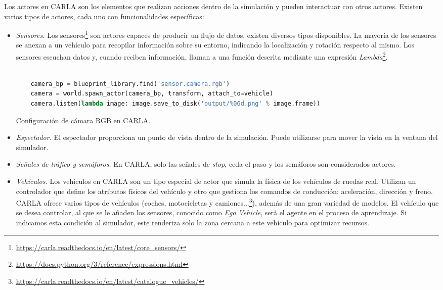Los actores en CARLA son los elementos que realizan acciones dentro de la simulación y pueden interactuar con otros actores. Existen varios tipos de actores, cada uno con funcionalidades específicas:

\begin{itemize}
\item \textit{Sensores.} Los sensores\footnote{\url{https://carla.readthedocs.io/en/latest/core_sensors/}} son actores capaces de producir un flujo de datos, existen diversos tipos disponibles. La mayoría de los sensores se anexan a un vehículo para recopilar información sobre su entorno, indicando la localización y rotación respecto al mismo. Los sensores escuchan datos y, cuando reciben información, llaman a una función descrita mediante una expresión \textit{Lambda}\footnote{\url{https://docs.python.org/3/reference/expressions.html}}. 

	\begin{code}[h]
	\begin{lstlisting}[language=python]
	
	camera_bp = blueprint_library.find('sensor.camera.rgb')
	camera = world.spawn_actor(camera_bp, transform, attach_to=vehicle)
	camera.listen(lambda image: image.save_to_disk('output/%06d.png' % image.frame))

	\end{lstlisting}
	\caption[Configuración de cámara RGB en CARLA]{Configuración de cámara RGB en CARLA.}
	\label{cod:camara_carla}
	\end{code}


\item \textit{Espectador.} El espectador proporciona un punto de vista dentro de la simulación. Puede utilizarse para mover la vista en la ventana del simulador.
\item \textit{Señales de tráfico y semáforos.} En CARLA, solo las señales de \textit{stop}, ceda el paso y los semáforos son considerados actores.

\item \textit{Vehículos.} Los vehículos en CARLA son un tipo especial de actor que simula la física de los vehículos de ruedas real. Utilizan un controlador que define los atributos físicos del vehículo y otro que gestiona los comandos de conducción: aceleración, dirección y freno. CARLA ofrece varios tipos de vehículos (coches, motocicletas y camiones...\footnote{\url{https://carla.readthedocs.io/en/latest/catalogue_vehicles/}}), además de una gran variedad de modelos. El vehículo que se desea controlar, al que se le añaden los sensores, conocido como \textit{Ego Vehicle}, será el agente en el proceso de aprendizaje. Si indicamos esta condición al simulador, este renderiza solo la zona cercana a este vehículo para optimizar recursos.


\end{itemize}
